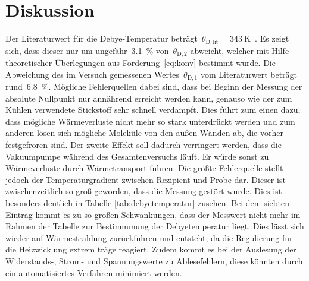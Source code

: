 \section{Diskussion}
\label{sec:diskussion}
Der Literaturwert für die Debye-Temperatur
beträgt~$\theta_{\mathrm{D,lit}}=\SI{343}{\kelvin}$~\cite{kittel}.
Es zeigt sich, dass dieser nur um ungefähr~\SI{3.1}{\percent}
von~$\theta_{\mathrm{D,2}}$ abweicht, welcher mit Hilfe theoretischer
Überlegungen aus Forderung~\eqref{eq:konv} bestimmt wurde.
Die Abweichung des im Versuch gemessenen
Wertes~$\theta_{\mathrm{D,1}}$ vom Literaturwert beträgt
rund~\SI{6.8}{\percent}. Mögliche Fehlerquellen dabei sind, dass bei Beginn der Messung
der absolute Nullpunkt nur annährend erreicht werden kann, genauso wie der zum Kühlen
verwendete Stickstoff sehr schnell verdampft. Dies führt zum einen dazu, dass mögliche
Wärmeverluste nicht mehr so stark unterdrückt werden und zum anderen lösen sich mögliche
Moleküle von den außen Wänden ab, die vorher festgefroren sind. Der zweite Effekt soll
dadurch verringert werden, dass die Vakuumpumpe während des Gesamtenversuchs läuft. Er
würde sonst zu Wärmeverluste durch Wärmetransport führen.
Die größte Fehlerquelle stellt jedoch der Temperaturgradient zwischen Rezipient und Probe
dar. Dieser ist zwischenzeitlich so groß geworden, dass die Messung gestört wurde. Dies ist
besonders deutlich in Tabelle \ref{tab:debyetemperatur} zusehen. Bei dem siebten Eintrag kommt
es zu so großen Schwankungen, dass der Messwert nicht mehr im Rahmen der Tabelle zur Bestimmmung
der Debyetemperatur liegt. Dies lässt sich wieder auf Wärmestrahlung zurückführen und entsteht, da
die Regulierung für die Heizwicklung extrem träge reagiert.
Zudem kommt es bei der Auslesung der Widerstands-, Strom- und Spannungswerte zu Ablesefehlern,
diese könnten durch ein automatisiertes Verfahren minimiert werden.
